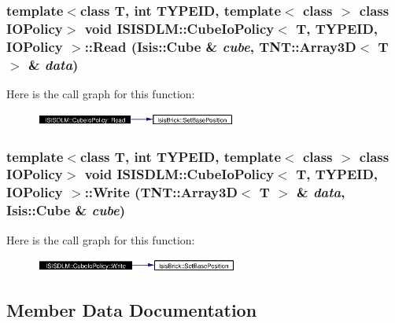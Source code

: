 \subsubsection{\setlength{\rightskip}{0pt plus 5cm}template$<$class T, int TYPEID, template$<$ class $>$ class IOPolicy$>$ void {\bf ISISDLM::Cube\-Io\-Policy}$<$ T, TYPEID, IOPolicy $>$::Read (Isis::Cube \& {\em cube}, TNT::Array3D$<$ T $>$ \& {\em data})\hspace{0.3cm}{\tt  [inline]}}\label{classISISDLM_1_1CubeIoPolicy_a4}




Here is the call graph for this function:\begin{figure}[H]
\begin{center}
\leavevmode
\includegraphics[width=187pt]{classISISDLM_1_1CubeIoPolicy_a4_cgraph}
\end{center}
\end{figure}
\subsubsection{\setlength{\rightskip}{0pt plus 5cm}template$<$class T, int TYPEID, template$<$ class $>$ class IOPolicy$>$ void {\bf ISISDLM::Cube\-Io\-Policy}$<$ T, TYPEID, IOPolicy $>$::Write (TNT::Array3D$<$ T $>$ \& {\em data}, Isis::Cube \& {\em cube})\hspace{0.3cm}{\tt  [inline]}}\label{classISISDLM_1_1CubeIoPolicy_a5}




Here is the call graph for this function:\begin{figure}[H]
\begin{center}
\leavevmode
\includegraphics[width=188pt]{classISISDLM_1_1CubeIoPolicy_a5_cgraph}
\end{center}
\end{figure}


\subsection{Member Data Documentation}
